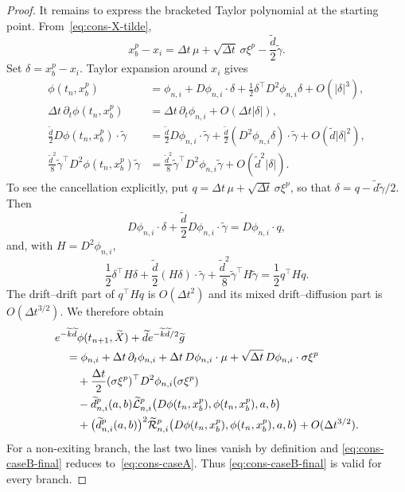 \documentclass[11pt]{article}
\theoremstyle{definition}
\theoremstyle{remark}
\begin{document}
\begin{proof}
		It remains to express the bracketed Taylor polynomial at the starting point.
		From~\eqref{eq:cons-X-tilde},
		\begin{equation}
			x_b^p-x_i=\Delta t\,\mu+\sqrt{\Delta t}\,\sigma\xi^p
			-\frac{\widetilde d}{2}\widetilde\gamma.
			\label{eq:xb-xi-relation}
		\end{equation}
		Set $\delta=x_b^p-x_i$.  Taylor expansion around $x_i$ gives
		\begin{align*}
			\phi(t_n,x_b^p)
			&=\phi_{n,i}+D\phi_{n,i}\cdot\delta
			+\frac12\delta^\top D^2\phi_{n,i}\delta+O(|\delta|^3),\\
			\Delta t\,\partial_t\phi(t_n,x_b^p)
			&=\Delta t\,\partial_t\phi_{n,i}+O(\Delta t|\delta|),\\
			\frac{\widetilde d}{2}D\phi(t_n,x_b^p)\cdot\widetilde\gamma
			&=\frac{\widetilde d}{2}D\phi_{n,i}\cdot\widetilde\gamma
			+\frac{\widetilde d}{2}(D^2\phi_{n,i}\delta)\cdot\widetilde\gamma
			+O(\widetilde d|\delta|^2),\\
			\frac{\widetilde d^2}{8}\widetilde\gamma^\top
			D^2\phi(t_n,x_b^p)\widetilde\gamma
			&=\frac{\widetilde d^2}{8}\widetilde\gamma^\top
			D^2\phi_{n,i}\widetilde\gamma+O(\widetilde d^2|\delta|).
		\end{align*}
		To see the cancellation explicitly, put
		$q=\Delta t\,\mu+\sqrt{\Delta t}\,\sigma\xi^p$, so that
		$\delta=q-\widetilde d\widetilde\gamma/2$.  Then
		\[
		D\phi_{n,i}\cdot\delta
		+\frac{\widetilde d}{2}D\phi_{n,i}\cdot\widetilde\gamma
		=D\phi_{n,i}\cdot q,
		\]
		and, with $H=D^2\phi_{n,i}$,
		\[
		\frac12\delta^\top H\delta
		+\frac{\widetilde d}{2}(H\delta)\cdot\widetilde\gamma
		+\frac{\widetilde d^2}{8}\widetilde\gamma^\top H\widetilde\gamma
		=\frac12q^\top Hq.
		\]
		The drift--drift part of $q^\top Hq$ is $O(\Delta t^2)$ and its mixed
		drift--diffusion part is $O(\Delta t^{3/2})$.  We therefore obtain
		\begin{align}
			&e^{-\widetilde k\widetilde d}\phi(t_{n+1},\widetilde X)
			+\widetilde d e^{-\widetilde k\widetilde d/2}\widetilde g
			\notag\\
			&\quad=\phi_{n,i}+\Delta t\,\partial_t\phi_{n,i}
			+\Delta t\,D\phi_{n,i}\cdot\mu
			+\sqrt{\Delta t}\,D\phi_{n,i}\cdot\sigma\xi^p
			\notag\\
			&\qquad+\frac{\Delta t}{2}(\sigma\xi^p)^\top
			D^2\phi_{n,i}(\sigma\xi^p)
			\notag\\
			&\qquad-\widetilde d_{n,i}^p(a,b)
			\widetilde{\mathcal L}_{n,i}^p
			\bigl(D\phi(t_n,x_b^p),\phi(t_n,x_b^p),a,b\bigr)
			\notag\\
			&\qquad+\bigl(\widetilde d_{n,i}^p(a,b)\bigr)^2
			\widetilde{\mathcal R}_{n,i}^p
			\bigl(D\phi(t_n,x_b^p),\phi(t_n,x_b^p),a,b\bigr)
			+O(\Delta t^{3/2}).
			\label{eq:cons-caseB-final}
		\end{align}
		For a non-exiting branch, the last two lines vanish by definition and
		\eqref{eq:cons-caseB-final} reduces to~\eqref{eq:cons-caseA}.  Thus
		\eqref{eq:cons-caseB-final} is valid for every branch.
		

\end{proof}
\end{document}
